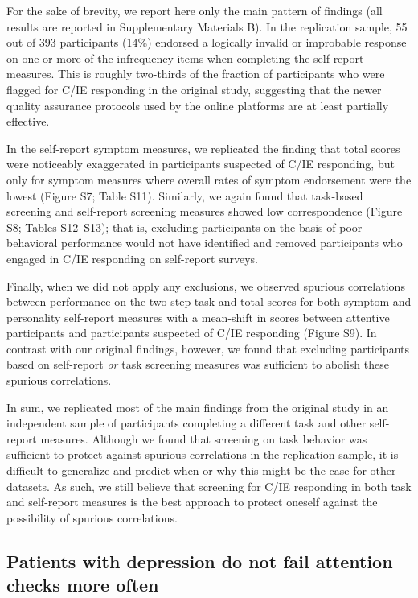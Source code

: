\documentclass[a4paper,notitlepage,12pt]{article}
\begin{document}
For the sake of brevity, we report here only the main pattern of findings (all results are reported in Supplementary Materials B). In the replication sample, 55 out of 393 participants (14\%) endorsed a logically invalid or improbable response on one or more of the infrequency items when completing the self-report measures. This is roughly two-thirds of the fraction of participants who were flagged for C/IE responding in the original study, suggesting that the newer quality assurance protocols used by the online platforms are at least partially effective. 

In the self-report symptom measures, we replicated the finding that total scores were noticeably exaggerated in participants suspected of C/IE responding, but only for symptom measures where overall rates of symptom endorsement were the lowest (Figure S7; Table S11). Similarly, we again found that task-based screening and self-report screening measures showed low correspondence (Figure S8; Tables S12--S13); that is, excluding participants on the basis of poor behavioral performance would not have identified and removed participants who engaged in C/IE responding on self-report surveys. 

Finally, when we did not apply any exclusions, we observed spurious correlations between performance on the two-step task and total scores for both symptom and personality self-report measures with a mean-shift in scores between attentive participants and participants suspected of C/IE responding (Figure S9). In contrast with our original findings, however, we found that excluding participants based on self-report \textit{or} task screening measures was sufficient to abolish these spurious correlations. 

In sum, we replicated most of the main findings from the original study in an independent sample of participants completing a different task and other self-report measures. Although we found that screening on task behavior was sufficient to protect against spurious correlations in the replication sample, it is difficult to generalize and predict when or why this might be the case for other datasets. As such, we still believe that screening for C/IE responding in both task and self-report measures is the best approach to protect oneself against the possibility of spurious correlations.

\subsection*{Patients with depression do not fail attention checks more often}
\end{document}
